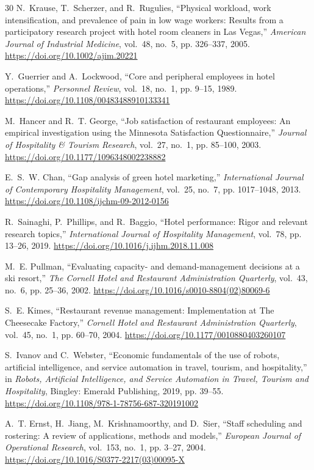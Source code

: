 \documentclass[11pt,a4paper]{article}
\begin{document}
\begin{thebibliography}{30}
N.~Krause, T.~Scherzer, and R.~Rugulies, ``Physical workload, work intensification, and prevalence of pain in low wage workers: Results from a participatory research project with hotel room cleaners in Las Vegas,'' \emph{American Journal of Industrial Medicine}, vol.~48, no.~5, pp. 326--337, 2005. \url{https://doi.org/10.1002/ajim.20221}

Y.~Guerrier and A.~Lockwood, ``Core and peripheral employees in hotel operations,'' \emph{Personnel Review}, vol.~18, no.~1, pp. 9--15, 1989. \url{https://doi.org/10.1108/00483488910133341}

M.~Hancer and R.~T. George, ``Job satisfaction of restaurant employees: An empirical investigation using the Minnesota Satisfaction Questionnaire,'' \emph{Journal of Hospitality \& Tourism Research}, vol.~27, no.~1, pp. 85--100, 2003. \url{https://doi.org/10.1177/1096348002238882}

E.~S.~W. Chan, ``Gap analysis of green hotel marketing,'' \emph{International Journal of Contemporary Hospitality Management}, vol.~25, no.~7, pp. 1017--1048, 2013. \url{https://doi.org/10.1108/ijchm-09-2012-0156}

R.~Sainaghi, P.~Phillips, and R.~Baggio, ``Hotel performance: Rigor and relevant research topics,'' \emph{International Journal of Hospitality Management}, vol.~78, pp. 13--26, 2019. \url{https://doi.org/10.1016/j.ijhm.2018.11.008}

M.~E. Pullman, ``Evaluating capacity- and demand-management decisions at a ski resort,'' \emph{The Cornell Hotel and Restaurant Administration Quarterly}, vol.~43, no.~6, pp. 25--36, 2002. \url{https://doi.org/10.1016/s0010-8804(02)80069-6}

S.~E. Kimes, ``Restaurant revenue management: Implementation at The Cheesecake Factory,'' \emph{Cornell Hotel and Restaurant Administration Quarterly}, vol.~45, no.~1, pp. 60--70, 2004. \url{https://doi.org/10.1177/0010880403260107}

S.~Ivanov and C.~Webster, ``Economic fundamentals of the use of robots, artificial intelligence, and service automation in travel, tourism, and hospitality,'' in \emph{Robots, Artificial Intelligence, and Service Automation in Travel, Tourism and Hospitality}, Bingley: Emerald Publishing, 2019, pp. 39--55. \url{https://doi.org/10.1108/978-1-78756-687-320191002}

A.~T. Ernst, H.~Jiang, M.~Krishnamoorthy, and D.~Sier, ``Staff scheduling and rostering: A review of applications, methods and models,'' \emph{European Journal of Operational Research}, vol.~153, no.~1, pp. 3--27, 2004. \url{https://doi.org/10.1016/S0377-2217(03)00095-X}


\end{thebibliography}
\end{document}
